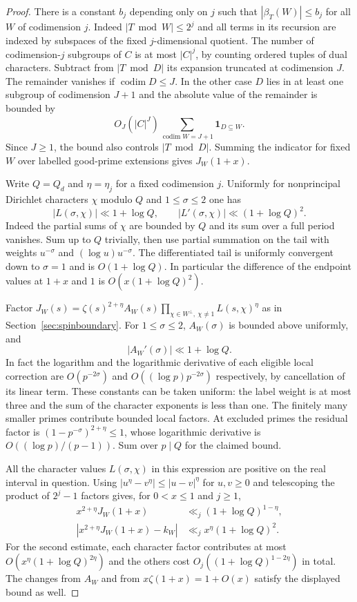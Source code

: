 \begin{proof}
There is a constant $b_j$ depending only on $j$ such that $|\beta_T(W)|\le b_j$ for all $W$ of codimension $j$. Indeed $|T\bmod W|\le2^j$ and all terms in its recursion are indexed by subspaces of the fixed $j$-dimensional quotient. The number of codimension-$j$ subgroups of $C$ is at most $|C|^j$, by counting ordered tuples of dual characters. Subtract from $|T\bmod D|$ its expansion truncated at codimension $J$. The remainder vanishes if $\operatorname{codim}D\le J$. In the other case $D$ lies in at least one subgroup of codimension $J+1$ and the absolute value of the remainder is bounded by
\[
 O_J(|C|^J)\sum_{\operatorname{codim}W=J+1}\mathbf1_{D\subseteq W}.
\]
Since $J\ge1$, the bound also controls $|T\bmod D|$. Summing the indicator for fixed $W$ over labelled good-prime extensions gives $J_W(1+x)$.

Write $Q=Q_d$ and $\eta=\eta_j$ for a fixed codimension $j$. Uniformly for nonprincipal Dirichlet characters $\chi$ modulo $Q$ and $1\le\sigma\le2$ one has
\[
 |L(\sigma,\chi)|\ll1+\log Q,\qquad
 |L'(\sigma,\chi)|\ll(1+\log Q)^2.
\]
Indeed the partial sums of $\chi$ are bounded by $Q$ and its sum over a full period vanishes. Sum up to $Q$ trivially, then use partial summation on the tail with weights $u^{-\sigma}$ and $(\log u)u^{-\sigma}$. The differentiated tail is uniformly convergent down to $\sigma=1$ and is $O(1+\log Q)$. In particular the difference of the endpoint values at $1+x$ and $1$ is $O(x(1+\log Q)^2)$.

Factor $J_W(s)=\zeta(s)^{2+\eta}A_W(s)\prod_{\chi\in W^\perp,\ \chi\ne1}L(s,\chi)^\eta$ as in Section~\ref{sec:spinboundary}. For $1\le\sigma\le2$, $A_W(\sigma)$ is bounded above uniformly, and
\[
 |A_W'(\sigma)|\ll 1+\log Q.
\]
In fact the logarithm and the logarithmic derivative of each eligible local correction are $O(p^{-2\sigma})$ and $O((\log p)p^{-2\sigma})$ respectively, by cancellation of its linear term. These constants can be taken uniform: the label weight is at most three and the sum of the character exponents is less than one. The finitely many smaller primes contribute bounded local factors. At excluded primes the residual factor is $(1-p^{-\sigma})^{2+\eta}\le1$, whose logarithmic derivative is $O((\log p)/(p-1))$. Sum over $p\mid Q$ for the claimed bound.

All the character values $L(\sigma,\chi)$ in this expression are positive on the real interval in question. Using $|u^\eta-v^\eta|\le |u-v|^\eta$ for $u,v\ge0$ and telescoping the product of $2^j-1$ factors gives, for $0<x\le1$ and $j\ge1$,
\begin{align*}
 x^{2+\eta}J_W(1+x)&\ll_j (1+\log Q)^{1-\eta},\\
 |x^{2+\eta}J_W(1+x)-k_W|&\ll_j x^\eta(1+\log Q)^2 .
\end{align*}
For the second estimate, each character factor contributes at most $O(x^\eta(1+\log Q)^{2\eta})$ and the others cost $O_j((1+\log Q)^{1-2\eta})$ in total. The changes from $A_W$ and from $x\zeta(1+x)=1+O(x)$ satisfy the displayed bound as well.


\end{proof}
